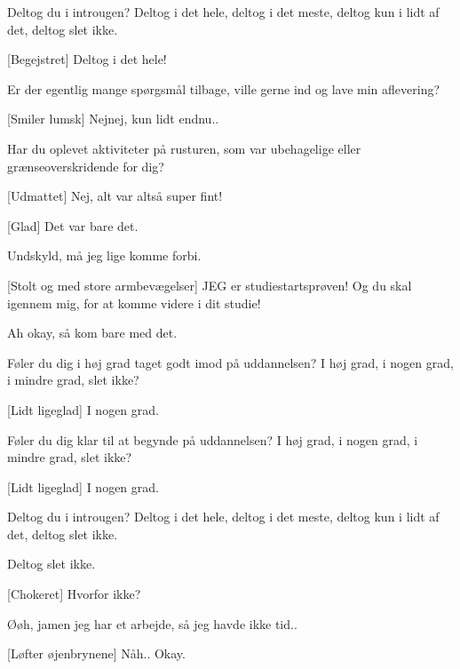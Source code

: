 \documentclass[a4paper,11pt]{article}
\begin{document}
\begin{sketch}
 Deltog du i introugen? Deltog i det hele, deltog i det meste, deltog kun i lidt af det, deltog slet ikke.

[Begejstret] Deltog i det hele!


 Er der egentlig mange spørgsmål tilbage, ville gerne ind og lave min aflevering?

[Smiler lumsk] Nejnej, kun lidt endnu..


 Har du oplevet aktiviteter på rusturen, som var ubehagelige eller grænseoverskridende for dig?

[Udmattet] Nej, alt var altså super fint!

[Glad] Det var bare det.


 Undskyld, må jeg lige komme forbi.

[Stolt og med store armbevægelser] JEG er studiestartsprøven! Og du skal igennem mig, for at komme videre i dit studie!

 Ah okay, så kom bare med det.

 Føler du dig i høj grad taget godt imod på uddannelsen? I høj grad, i nogen grad, i mindre grad, slet ikke?

[Lidt ligeglad] I nogen grad.

 Føler du dig klar til at begynde på uddannelsen? I høj grad, i nogen grad, i mindre grad, slet ikke?

[Lidt ligeglad] I nogen grad.

 Deltog du i introugen? Deltog i det hele, deltog i det meste, deltog kun i lidt af det, deltog slet ikke.

 Deltog slet ikke.

[Chokeret] Hvorfor ikke?

 Øøh, jamen jeg har et arbejde, så jeg havde ikke tid..

[Løfter øjenbrynene] Nåh.. Okay.



\end{sketch}
\end{document}
